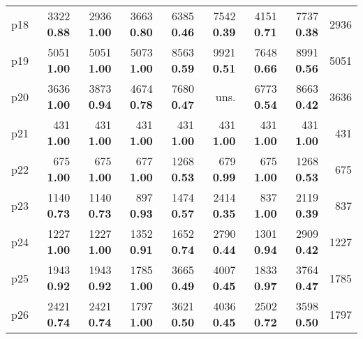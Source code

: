 \begin{tabular}{|l|rrrrrrr|r|}
p18 & {\footnotesize 3322} \textbf{0.88} & {\footnotesize 2936} \textbf{1.00} & {\footnotesize 3663} \textbf{0.80} & {\footnotesize 6385} \textbf{0.46} & {\footnotesize 7542} \textbf{0.39} & {\footnotesize 4151} \textbf{0.71} & {\footnotesize 7737} \textbf{0.38} & 2936\\
p19 & {\footnotesize 5051} \textbf{1.00} & {\footnotesize 5051} \textbf{1.00} & {\footnotesize 5073} \textbf{1.00} & {\footnotesize 8563} \textbf{0.59} & {\footnotesize 9921} \textbf{0.51} & {\footnotesize 7648} \textbf{0.66} & {\footnotesize 8991} \textbf{0.56} & 5051\\
p20 & {\footnotesize 3636} \textbf{1.00} & {\footnotesize 3873} \textbf{0.94} & {\footnotesize 4674} \textbf{0.78} & {\footnotesize 7680} \textbf{0.47} & uns. & {\footnotesize 6773} \textbf{0.54} & {\footnotesize 8663} \textbf{0.42} & 3636\\
p21 & {\footnotesize 431} \textbf{1.00} & {\footnotesize 431} \textbf{1.00} & {\footnotesize 431} \textbf{1.00} & {\footnotesize 431} \textbf{1.00} & {\footnotesize 431} \textbf{1.00} & {\footnotesize 431} \textbf{1.00} & {\footnotesize 431} \textbf{1.00} & 431\\
p22 & {\footnotesize 675} \textbf{1.00} & {\footnotesize 675} \textbf{1.00} & {\footnotesize 677} \textbf{1.00} & {\footnotesize 1268} \textbf{0.53} & {\footnotesize 679} \textbf{0.99} & {\footnotesize 675} \textbf{1.00} & {\footnotesize 1268} \textbf{0.53} & 675\\
p23 & {\footnotesize 1140} \textbf{0.73} & {\footnotesize 1140} \textbf{0.73} & {\footnotesize 897} \textbf{0.93} & {\footnotesize 1474} \textbf{0.57} & {\footnotesize 2414} \textbf{0.35} & {\footnotesize 837} \textbf{1.00} & {\footnotesize 2119} \textbf{0.39} & 837\\
p24 & {\footnotesize 1227} \textbf{1.00} & {\footnotesize 1227} \textbf{1.00} & {\footnotesize 1352} \textbf{0.91} & {\footnotesize 1652} \textbf{0.74} & {\footnotesize 2790} \textbf{0.44} & {\footnotesize 1301} \textbf{0.94} & {\footnotesize 2909} \textbf{0.42} & 1227\\
p25 & {\footnotesize 1943} \textbf{0.92} & {\footnotesize 1943} \textbf{0.92} & {\footnotesize 1785} \textbf{1.00} & {\footnotesize 3665} \textbf{0.49} & {\footnotesize 4007} \textbf{0.45} & {\footnotesize 1833} \textbf{0.97} & {\footnotesize 3764} \textbf{0.47} & 1785\\
p26 & {\footnotesize 2421} \textbf{0.74} & {\footnotesize 2421} \textbf{0.74} & {\footnotesize 1797} \textbf{1.00} & {\footnotesize 3621} \textbf{0.50} & {\footnotesize 4036} \textbf{0.45} & {\footnotesize 2502} \textbf{0.72} & {\footnotesize 3598} \textbf{0.50} & 1797\\

\end{tabular}
